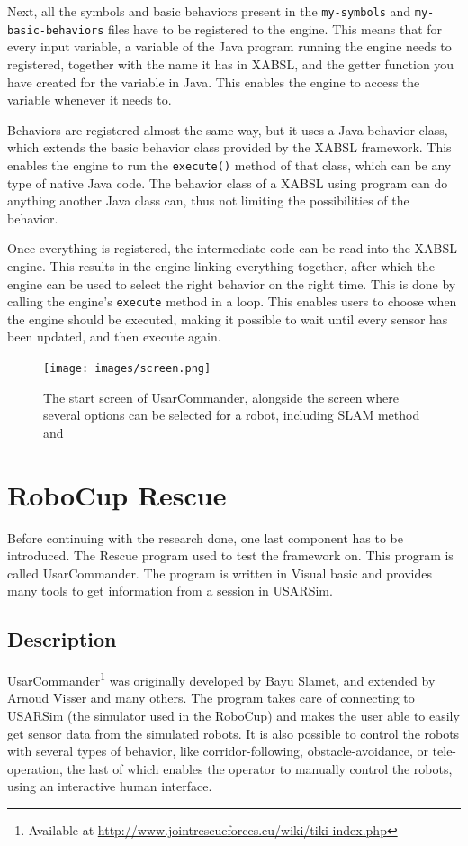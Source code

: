 \documentclass[a4paper,10pt]{article}
\begin{document}
Next, all the symbols and basic behaviors present in the \texttt{my-symbols} and
\texttt{my-basic-behaviors} files have to be registered to the engine. This
means that for every input variable, a variable of the Java program running the
engine needs to registered, together with the name it has in XABSL, and the
getter function you have created for the variable in Java. This enables the
engine to access the variable whenever it needs to. 

Behaviors are registered almost the same way, but it uses a Java behavior class,
which extends the basic behavior class provided by the XABSL framework. This
enables the engine to run the \texttt{execute()} method of that class, which can
be any type of native Java code. The behavior class of a XABSL using program can
do anything another Java class can, thus not limiting the possibilities of the
behavior. 

Once everything is registered, the intermediate code can be read into the XABSL
engine. This results in the engine linking everything together, after which the
engine can be used to select the right behavior on the right time. This is done
by calling the engine's \texttt{execute} method in a loop. This enables users to
choose when the engine should be executed, making it possible to wait until
every sensor has been updated, and then execute again.

\begin{landscape}
\begin{figure}
    \centering
    \texttt{[image: images/screen.png]}
    \caption{The start screen of UsarCommander, alongside the screen where
    several options can be selected for a robot, including SLAM method and }
    \label{fig:usarcommander}
\end{figure}
\end{landscape}
\section{RoboCup Rescue}
Before continuing with the research done, one last component has to be
introduced. The Rescue program used to test the framework on. This program is
called UsarCommander. The program is written in Visual basic and provides many
tools to get information from a session in USARSim.

\subsection{Description}
UsarCommander\footnote{Available at
\url{http://www.jointrescueforces.eu/wiki/tiki-index.php}} was originally developed by Bayu Slamet, and extended by Arnoud
Visser and many others. The program takes care of connecting to USARSim (the
simulator used in the RoboCup) and
makes the user able to easily get sensor data from the simulated robots. It is also
possible to control the robots with several types of behavior, like
corridor-following, obstacle-avoidance, or tele-operation, the last of which
enables the operator to manually control the robots, using an
interactive human interface.
\end{document}
